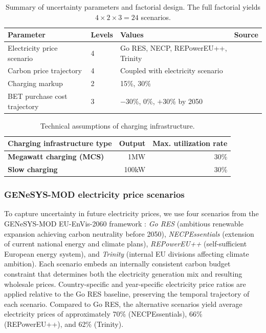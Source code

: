 \documentclass[preprint,10pt,review, authoryear]{elsarticle}
\begin{document}
        \begin{table}[H]
        \centering
        \caption{Summary of uncertainty parameters and factorial design. The full factorial yields $4 \times 2 \times 3 = 24$ scenarios.}
        \label{tab:uncertainty_parameters}
        \begin{tabular}{@{}llll@{}}
        \toprule
        \textbf{Parameter} & \textbf{Levels} & \textbf{Values} & \textbf{Source} \\ \midrule
        Electricity price scenario & 4 & Go RES, NECP, REPowerEU++, Trinity & \citep{loffler2025euenvis} \\
        Carbon price trajectory & 4 & Coupled with electricity scenario & \citep{loffler2025euenvis} \\
        Charging markup & 2 & 15\%, 30\% & \citep{Lanz2022} \\
        BET purchase cost trajectory & 3 & $-$30\%, 0\%, $+$30\% by 2050 & \\ \bottomrule
        \end{tabular}
        \end{table}
        \begin{table}[]
\centering
\caption{Technical assumptions of charging infrastructure.}
\label{tab:cs_types}
\begin{tabular}{@{}lrr@{}}
\toprule
Charging infrastructure type     & Output & Max. utilization rate \\ \midrule
\textbf{Megawatt charging (MCS)} & 1MW    & 30\%                  \\
\textbf{Slow charging}           & 100kW  & 30\%                  \\ \bottomrule
\end{tabular}
\end{table}

        \subsubsection{GENeSYS-MOD electricity price scenarios}
        To capture uncertainty in future electricity prices, we use four scenarios from the GENeSYS-MOD EU-EnVis-2060 framework \citep{EUEnVis2025}: \textit{Go RES} (ambitious renewable expansion achieving carbon neutrality before 2050), \textit{NECPEssentials} (extension of current national energy and climate plans), \textit{REPowerEU++} (self-sufficient European energy system), and \textit{Trinity} (internal EU divisions affecting climate ambition). Each scenario embeds an internally consistent carbon budget constraint that determines both the electricity generation mix and resulting wholesale prices. Country-specific and year-specific electricity price ratios are applied relative to the Go RES baseline, preserving the temporal trajectory of each scenario. Compared to Go RES, the alternative scenarios yield average electricity prices of approximately 70\% (NECPEssentials), 66\% (REPowerEU++), and 62\% (Trinity).
\end{document}
